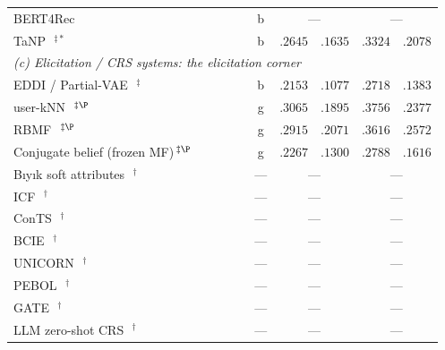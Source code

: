 \documentclass[manuscript,screen]{acmart}
\newcommand{\cmark}{\ding{51}}
\newcommand{\xmark}{\ding{55}}
\begin{document}
\begin{table}[t]
\begin{tabular}{p{4.9cm}cccc c r@{\,/\,}l r@{\,/\,}l}
BERT4Rec~\citep{sun2019bert4rec} & \xmark & \xmark & \xmark & \xmark & b & \multicolumn{2}{c}{---} & \multicolumn{2}{c}{---} \\
TaNP~\citep{lin2021tanp}\,$^{\ddagger\ast}$ & \xmark & \xmark & \xmark & \cmark & b & $.2645$ & $.1635$ & $.3324$ & $.2078$ \\
\midrule
\multicolumn{10}{l}{\emph{(c) Elicitation / CRS systems: the elicitation corner}}\\
EDDI / Partial-VAE~\citep{ma2019eddi}\,$^{\ddagger}$ & \xmark & \xmark & \xmark & \cmark & b & $.2153$ & $.1077$ & $.2718$ & $.1383$ \\
user-kNN~\citep{golbandi2011adaptive}\,$^{\ddagger\P}$ & \xmark & \xmark & \xmark & \cmark & g & $.3065$ & $.1895$ & $.3756$ & $.2377$ \\
RBMF~\citep{liu2011wisdom,zhou2011functional}\,$^{\ddagger\P}$ & \xmark & \xmark & \xmark & \cmark & g & $.2915$ & $.2071$ & $.3616$ & $.2572$ \\
Conjugate belief (frozen MF)\,$^{\ddagger\P}$ & \xmark & \xmark & \xmark & \cmark & g & $.2267$ & $.1300$ & $.2788$ & $.1616$ \\
B\i y\i k soft attributes~\citep{biyik2023soft}\,$^{\dagger}$ & \xmark & \xmark & \xmark & \cmark & --- & \multicolumn{2}{c}{---} & \multicolumn{2}{c}{---} \\
ICF~\citep{zhao2013interactive}\,$^{\dagger}$ & \xmark & \xmark & \xmark & \cmark & --- & \multicolumn{2}{c}{---} & \multicolumn{2}{c}{---} \\
ConTS~\citep{li2021seamlessly}\,$^{\dagger}$ & \xmark & \xmark & \xmark & \xmark & --- & \multicolumn{2}{c}{---} & \multicolumn{2}{c}{---} \\
BCIE~\citep{toroghi2023bcie}\,$^{\dagger}$ & \xmark & \xmark & \cmark & \xmark & --- & \multicolumn{2}{c}{---} & \multicolumn{2}{c}{---} \\
UNICORN~\citep{deng2021unicorn}\,$^{\dagger}$ & \xmark & \xmark & \xmark & \xmark & --- & \multicolumn{2}{c}{---} & \multicolumn{2}{c}{---} \\
PEBOL~\citep{austin2024bayesian}\,$^{\dagger}$ & \xmark & \cmark & \xmark & \xmark & --- & \multicolumn{2}{c}{---} & \multicolumn{2}{c}{---} \\
GATE~\citep{li2023eliciting}\,$^{\dagger}$ & \xmark & \cmark & \xmark & \cmark & --- & \multicolumn{2}{c}{---} & \multicolumn{2}{c}{---} \\
LLM zero-shot CRS~\citep{he2023large}\,$^{\dagger}$ & \xmark & \cmark & \xmark & \cmark & --- & \multicolumn{2}{c}{---} & \multicolumn{2}{c}{---} \\

\end{tabular}
\end{table}
\end{document}
